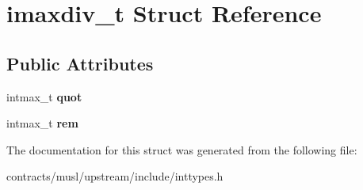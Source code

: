 \hypertarget{structimaxdiv__t}{}\section{imaxdiv\+\_\+t Struct Reference}
\label{structimaxdiv__t}
\subsection*{Public Attributes}
\begin{DoxyCompactItemize}
\item 
\mbox{\label{structimaxdiv__t_a9339814cbb7610c72fb7d30c6573b393}} 
intmax\+\_\+t {\bfseries quot}
\item 
\mbox{\label{structimaxdiv__t_a6c9701ad10bff81edae7ff679cae7850}} 
intmax\+\_\+t {\bfseries rem}
\end{DoxyCompactItemize}


The documentation for this struct was generated from the following file\+:\begin{DoxyCompactItemize}
\item 
contracts/musl/upstream/include/inttypes.\+h\end{DoxyCompactItemize}
